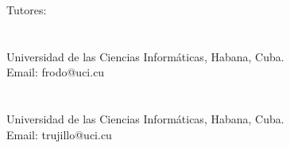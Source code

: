 
\noindent
Tutores:\\
\vspace{0.5cm}\\
\hspace{5cm} \tutorOne\\
\hspace{5cm} Universidad de las Ciencias Informáticas, Habana, Cuba.\\
\hspace{5cm} Email: frodo@uci.cu\\
\vspace{0.5cm}\\
\hspace{5cm} \tutorTwo\\
\hspace{5cm} Universidad de las Ciencias Informáticas, Habana, Cuba.\\
\hspace{5cm} Email: trujillo@uci.cu\\



